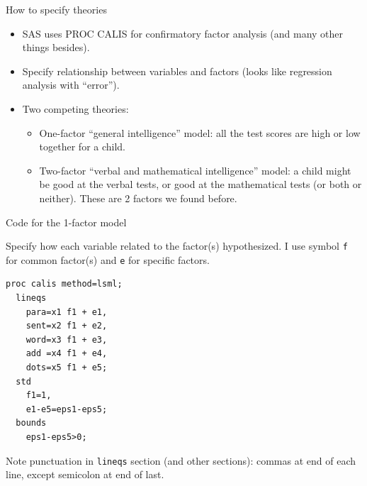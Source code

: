 \documentclass[pdf]{prosper}
\begin{document}
  \begin{slide}{How to specify theories}

    \begin{itemize}
    \item SAS uses PROC CALIS for confirmatory factor analysis (and many other things besides).
    \item Specify relationship between variables and factors (looks like regression analysis with ``error'').
      \item Two competing theories:
        \begin{itemize}
        \item One-factor ``general intelligence'' model: all the test scores are high or low together for a child.
        \item Two-factor ``verbal and mathematical intelligence'' model: a child might be good at the verbal tests, or good at the mathematical tests (or both or neither). These are 2 factors we found before.
        \end{itemize}
      \end{itemize}
    \end{slide}

\begin{slide}{Code for the 1-factor model}

Specify how each variable related to the factor(s) hypothesized. I use symbol \verb-f- for common factor(s) and \verb-e- for specific factors.

\begin{verbatim}
proc calis method=lsml;
  lineqs
    para=x1 f1 + e1,
    sent=x2 f1 + e2,
    word=x3 f1 + e3,
    add =x4 f1 + e4,
    dots=x5 f1 + e5;
  std
    f1=1,
    e1-e5=eps1-eps5;
  bounds
    eps1-eps5>0;
\end{verbatim}

Note punctuation in \verb-lineqs- section (and other sections): commas
at end of each line, except semicolon at end of last.
    
  \end{slide}
\end{document}
